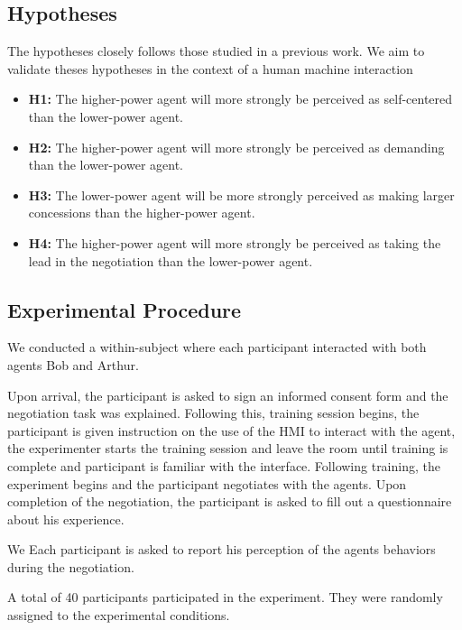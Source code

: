 \documentclass[runningheads,a4paper]{llncs}
\begin{document}
		\subsection{Hypotheses}
			The hypotheses closely follows those studied in a previous work. We aim to validate theses hypotheses in the context of a human machine interaction
			
			\begin{itemize}
					\item  \textbf{H1:} The higher-power agent will more strongly be perceived as self-centered than the lower-power agent.  
					
					\item \textbf{H2:}  The higher-power agent will more strongly be perceived as demanding than the lower-power agent.
										
					\item \textbf{H3:} The lower-power agent will be more strongly perceived as making larger concessions than the higher-power agent.
					
					\item \textbf{H4:}  The higher-power agent will more strongly be perceived as taking the lead in the negotiation than the lower-power agent.
					
				\end{itemize}
				
		\subsection{Experimental Procedure}
		We conducted a within-subject where each participant interacted with both  agents Bob and Arthur.
		
		Upon arrival, the participant is asked to sign an informed consent form and the negotiation task was explained. Following this, training session begins, the participant is given instruction on the use of the HMI to interact with the agent, the experimenter starts the training session and leave the room until training is complete and participant is familiar with the interface. Following training, the experiment begins and the participant negotiates with the agents. Upon completion of the negotiation, the participant is asked to fill out a questionnaire about his experience.
		
		We 
		 Each participant is asked to report his perception of the agents behaviors during the negotiation. 
	
		A total of 40 participants participated in the experiment. They were randomly assigned to the experimental conditions.%
		
\end{document}
